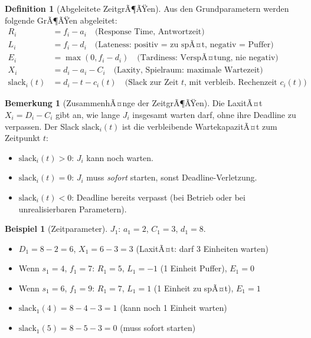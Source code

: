 ﻿\documentclass[a4paper,12pt]{report}
\theoremstyle{definition}
\newtheorem{definition}{Definition}[chapter]
\newtheorem{beispiel}{Beispiel}[chapter]
\newtheorem{bemerkung}{Bemerkung}[chapter]
\begin{document}
\begin{definition}[Abgeleitete ZeitgrÃ¶ÃŸen]
	Aus den Grundparametern werden folgende GrÃ¶ÃŸen abgeleitet:
	\begin{align*}
		R_i &= f_i - a_i \quad\text{(Response Time, Antwortzeit)}\\
		L_i &= f_i - d_i \quad\text{(Lateness: positiv = zu spÃ¤t, negativ = Puffer)}\\
		E_i &= \max(0, f_i - d_i) \quad\text{(Tardiness: VerspÃ¤tung, nie negativ)}\\
		X_i &= d_i - a_i - C_i \quad\text{(Laxity, Spielraum: maximale Wartezeit)}\\
		\text{slack}_i(t) &= d_i - t - c_i(t) \quad\text{(Slack zur Zeit }t\text{,
		mit verbleib. Rechenzeit }c_i(t))
	\end{align*}
\end{definition}

\begin{bemerkung}[ZusammenhÃ¤nge der ZeitgrÃ¶ÃŸen]
	Die LaxitÃ¤t $X_i = D_i - C_i$ gibt an, wie lange $J_i$ insgesamt warten
	darf, ohne ihre Deadline zu verpassen. Der Slack $\text{slack}_i(t)$ ist
	die verbleibende WartekapazitÃ¤t zum Zeitpunkt $t$:
	\begin{itemize}
		\item $\text{slack}_i(t) > 0$: $J_i$ kann noch warten.
		\item $\text{slack}_i(t) = 0$: $J_i$ muss \emph{sofort} starten, sonst
		      Deadline-Verletzung.
		\item $\text{slack}_i(t) < 0$: Deadline bereits verpasst (bei Betrieb oder
		      bei unrealisierbaren Parametern).
	\end{itemize}
\end{bemerkung}

\begin{beispiel}[Zeitparameter]
	$J_1$: $a_1=2$, $C_1=3$, $d_1=8$.
	\begin{itemize}
		\item $D_1 = 8-2 = 6$, $X_1 = 6-3 = 3$ (LaxitÃ¤t: darf 3 Einheiten warten)
		\item Wenn $s_1=4$, $f_1=7$: $R_1=5$, $L_1=-1$ (1 Einheit Puffer), $E_1=0$
		\item Wenn $s_1=6$, $f_1=9$: $R_1=7$, $L_1=1$ (1 Einheit zu spÃ¤t), $E_1=1$
		\item $\text{slack}_1(4) = 8-4-3 = 1$ (kann noch 1 Einheit warten)
		\item $\text{slack}_1(5) = 8-5-3 = 0$ (muss sofort starten)
	\end{itemize}
\end{beispiel}
\end{document}
